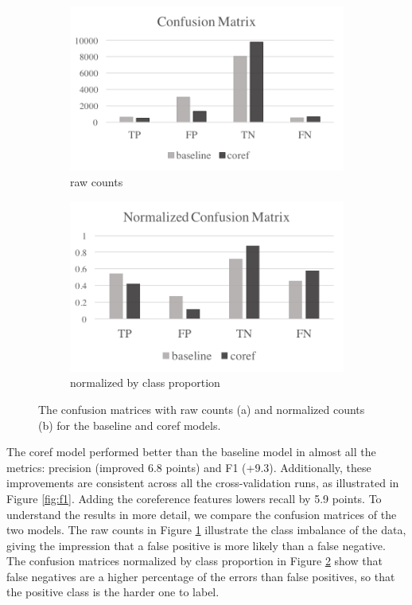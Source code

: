 \begin{figure}
\centering
\begin{subfigure}{.5\textwidth}
  \centering
  \includegraphics[width=1\linewidth]{plots/longer1_confusion_matrix_bar_chart.png}
  \caption{raw counts}
  \label{fig:conf_matrix_unnormalized}
\end{subfigure}%
\begin{subfigure}{.5\textwidth}
  \centering
  \includegraphics[width=1\linewidth]{plots/longer1_confusion_matrix_norm_bar_chart.png}
  \caption{normalized by class proportion}
  \label{fig:conf_matrix_normalized}
\end{subfigure}
\caption{The confusion matrices with raw counts (a) and normalized counts (b) for the baseline and coref models.}
\label{fig:conf_matrix}
\end{figure}

The coref model performed better than the baseline model in almost all the metrics: precision (improved 6.8 points) and F1 (+9.3). Additionally, these improvements are consistent across all the cross-validation runs, as illustrated in Figure \ref{fig:f1}. Adding the coreference features lowers recall by 5.9 points. To understand the results in more detail, we compare the confusion matrices of the two models. The raw counts in Figure \ref{fig:conf_matrix_unnormalized} illustrate the class imbalance of the data, giving the impression that a false positive is more likely than a false negative. The confusion matrices normalized by class proportion in Figure \ref{fig:conf_matrix_normalized} show that false negatives are a higher percentage of the errors than false positives, so that the positive class is the harder one to label. 

